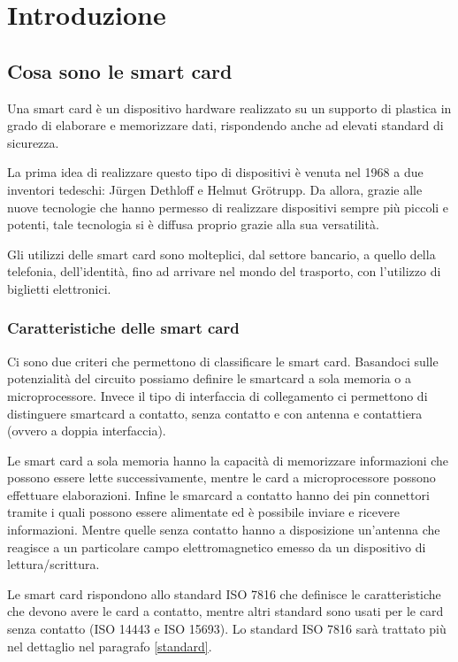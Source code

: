 \chapter{Introduzione}
\label{chapter1}

\section{Cosa sono le smart card}
Una smart card è un dispositivo hardware realizzato su un supporto di plastica in grado di elaborare e memorizzare dati, rispondendo anche ad elevati standard di sicurezza.

La prima idea di realizzare questo tipo di dispositivi è venuta nel 1968 a due inventori tedeschi: Jürgen Dethloff e Helmut Grötrupp. Da allora, grazie alle nuove tecnologie che hanno permesso di realizzare dispositivi sempre più piccoli e potenti, tale tecnologia si è diffusa proprio grazie alla sua versatilità.

Gli utilizzi delle smart card sono molteplici, dal settore bancario, a quello della telefonia, dell'identità, fino ad arrivare nel mondo del trasporto, con l'utilizzo di biglietti elettronici.
\cite{wiki_sc}

\subsection{Caratteristiche  delle smart card}

Ci sono due criteri che permettono di classificare le smart card. Basandoci sulle potenzialità del circuito possiamo definire le smartcard a sola memoria o a microprocessore. Invece il tipo di interfaccia di collegamento ci permettono di distinguere smartcard a contatto, senza contatto e con antenna e contattiera (ovvero a doppia interfaccia).

Le smart card a sola memoria hanno la capacità di memorizzare informazioni che possono essere lette successivamente, mentre le card a microprocessore possono effettuare elaborazioni. Infine le smarcard a contatto hanno dei pin connettori tramite i quali possono essere alimentate ed è possibile inviare e ricevere informazioni. Mentre quelle senza contatto hanno a disposizione un'antenna che reagisce a un particolare campo elettromagnetico emesso da un dispositivo di lettura/scrittura.

Le smart card rispondono allo standard ISO 7816 che definisce le caratteristiche che devono avere le card a contatto, mentre altri standard sono usati per le card senza contatto (ISO 14443 e ISO 15693). Lo standard ISO 7816 sarà trattato più nel dettaglio nel paragrafo \ref{standard}.

